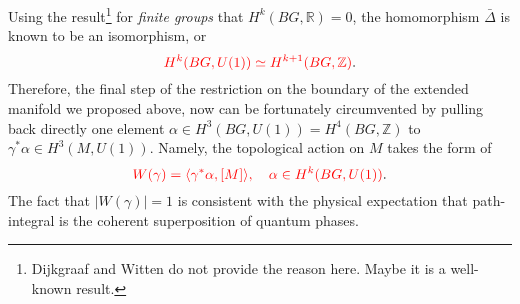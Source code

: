 \documentclass[10pt,nofootinbib,letterpaper]{revtex4}
\begin{document}
		Using the result\footnote{Dijkgraaf and Witten do not provide the reason here. Maybe it is a well-known result.} for \emph{finite groups} that $H^k(BG,\mathbb{R})=0$, the homomorphism $\bar\Delta$ is known to be an isomorphism, or
		\begin{equation}\label{A.3.4}
			{\color{red}H^k(BG,U(1))\simeq H^{k+1}(BG,\mathbb{Z})}.
		\end{equation}
		\indent Therefore, the final step of the restriction on the boundary of the extended manifold we proposed above, now can be fortunately circumvented by pulling back directly one element $\alpha\in H^3(BG,U(1))=H^4(BG,\mathbb{Z})$ to $\gamma^*\alpha\in H^3(M,U(1))$. Namely, the topological action on $M$ takes the form of
		\begin{equation}\label{A.3.3}
			{\color{red}W(\gamma)=\langle\gamma^*\alpha,[M]\rangle,\quad \alpha\in H^k(BG,U(1))}.
		\end{equation}
		The fact that $|W(\gamma)|=1$ is consistent with the physical expectation that path-integral is the coherent superposition of quantum phases.
\end{document}
